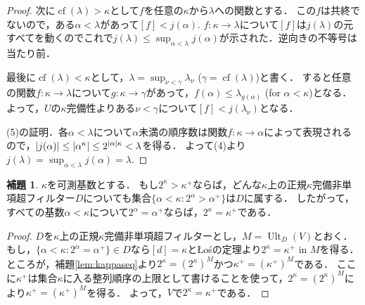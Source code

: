 \documentclass[uplatex]{jsarticle}
\newcommand{\cf}{\operatorname{cf}}
\newcommand{\Ult}{\operatorname{Ult}}
\DeclarePairedDelimiter\abs{\lvert}{\rvert}
\theoremstyle{definition}
\newtheorem{lem}[thm]{補題}
\begin{document}
\begin{proof}
		次に$\cf(\lambda) > \kappa$として$f$を任意の$\kappa$から$\lambda$への関数とする．
		この$f$は共終でないので，ある$\alpha < \lambda$があって$[f] < j(\alpha)$.
		$f \colon \kappa \to \lambda$について$[f]$は$j(\lambda)$の元すべてを動くのでこれで$j(\lambda) \le \sup_{\alpha < \lambda} j(\alpha)$が示された．逆向きの不等号は当たり前．
		
		最後に$\cf(\lambda) < \kappa$として，$\lambda = \sup_{\nu < \gamma} \lambda_\nu$ ($\gamma = \cf(\lambda)$)と書く．
		すると任意の関数$f \colon \kappa \to \lambda$について$g \colon \kappa \to \gamma$があって，$f(\alpha) \le \lambda_{g(\alpha)}$ (for $\alpha < \kappa$)となる．
		よって，$U$の$\kappa$完備性よりある$\nu < \gamma$について$[f] < j(\lambda_\nu)$となる．
		
		(5)の証明．各$\alpha < \lambda$について$\alpha$未満の順序数は関数$f \colon \kappa \to \alpha$によって表現されるので，$\abs{j(\alpha)} \le \abs{\alpha^\kappa} \le 2^{\abs{\alpha} \kappa} < \lambda$を得る．
		よって(4)より$j(\lambda) = \sup_{\alpha < \lambda} j(\alpha) = \lambda$.
	\end{proof}
		
	\begin{lem}
		$\kappa$を可測基数とする．
		もし$2^\kappa > \kappa^+$ならば，どんな$\kappa$上の正規$\kappa$完備非単項超フィルター$D$についても集合$\{ \alpha < \kappa : 2^\alpha > \alpha^+ \}$は$D$に属する．
		したがって，すべての基数$\alpha < \kappa$について$2^\alpha = \alpha^+$ならば，$2^\kappa = \kappa^+$である．
	\end{lem}
	\begin{proof}
		$D$を$\kappa$上の正規$\kappa$完備非単項超フィルターとし，$M = \Ult_D(V)$とおく．
		もし，$\{ \alpha < \kappa : 2^\alpha = \alpha^+ \} \in D$なら$[d] = \kappa$とŁośの定理より$2^\kappa = \kappa^+$ in $M$を得る．
		ところが，補題\ref{lem:kappaseq}より$2^\kappa = (2^\kappa)^M$かつ$\kappa^+ = (\kappa^+)^M$である．
		ここに$\kappa^+$は集合$\kappa$に入る整列順序の上限として書けることを使って，$2^\kappa = (2^\kappa)^M$により$\kappa^+ = (\kappa^+)^M$を得る．	
		よって，$V$で$2^\kappa = \kappa^+$である．
	\end{proof}
\end{document}
